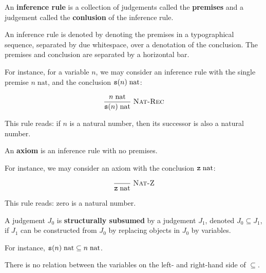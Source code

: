 \begin{definition}

An \textbf{inference rule} is a collection of judgements called the
\textbf{premises} and a judgement called the \textbf{conlusion} of the
inference rule.

\end{definition}

\begin{notation}

An inference rule is denoted by denoting the premises in a typographical
sequence, separated by due whitespace, over a denotation of the conclusion. The
premises and conclusion are separated by a horizontal bar.

\end{notation}

For instance, for a variable $n$, we may consider an inference rule with the
single premise $n\;\text{nat}$, and the conclusion $\mathtt{s}(n)\;\text{nat}$:

$$
\judgement[Nat-Rec]{
  n\;\text{nat}
}{
  \symb{s}(n)\;\text{nat}
}
$$

This rule reads: if $n$ is a natural number, then its successor is also a
natural number.

\begin{definition}

An \textbf{axiom} is an inference rule with no premises.

\end{definition}

For instance, we may consider an axiom with the conclusion
$\mathtt{z}\;\text{nat}$:

$$
\judgement[Nat-Z]{
}{
  \symb{z}\;\text{nat}
}
$$

This rule reads: zero is a natural number.

\begin{definition}

A judgement $J_0$ is \textbf{structurally subsumed} by a judgement $J_1$,
denoted $J_0\subseteq J_1$, if $J_1$ can be constructed from $J_0$ by replacing
objects in $J_0$ by variables.

\end{definition}

For instance, $\mathtt{s}(n)\;\text{nat}\subseteq n\;\text{nat}$.

\begin{remark}

There is no relation between the variables on the left- and right-hand side of
$\subseteq$.

\end{remark}

